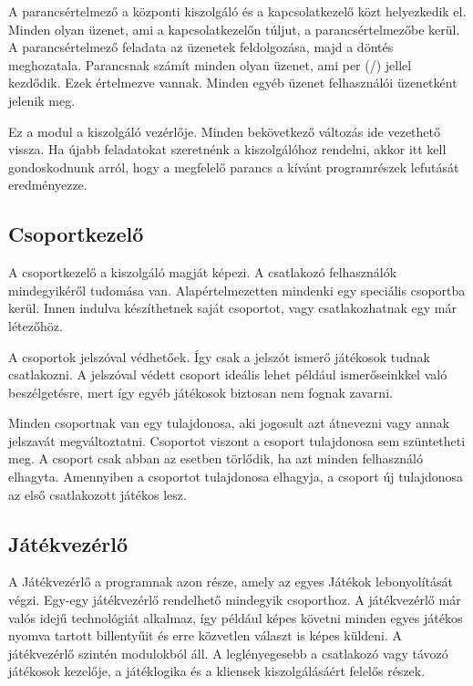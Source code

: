 \documentclass[bibliography=totocnumbered]{article}
\begin{document}
A parancsértelmező a központi kiszolgáló és a kapcsolatkezelő közt
helyezkedik el. Minden olyan üzenet, ami a kapcsolatkezelőn túljut, a
parancsértelmezőbe kerül. A parancsértelmező feladata az üzenetek
feldolgozása, majd a döntés meghozatala. Parancsnak számít minden olyan
üzenet, ami per (/) jellel kezdődik. Ezek értelmezve vannak. Minden
egyéb üzenet felhasználói üzenetként jelenik meg.

Ez a modul a kiszolgáló vezérlője. Minden bekövetkező változás ide
vezethető vissza. Ha újabb feladatokat szeretnénk a kiszolgálóhoz
rendelni, akkor itt kell gondoskodnunk arról, hogy a megfelelő parancs a
kívánt programrészek lefutását eredményezze.


\subsection{Csoportkezelő}

A csoportkezelő a kiszolgáló magját képezi. A csatlakozó felhasználók
mindegyikéről tudomása van. Alapértelmezetten mindenki egy speciális
csoportba kerül. Innen indulva készíthetnek saját csoportot, vagy
csatlakozhatnak egy már létezőhöz.

A csoportok jelszóval védhetőek. Így csak a jelszót ismerő játékosok
tudnak csatlakozni. A jelszóval védett csoport ideális lehet például
ismerőseinkkel való beszélgetésre, mert így egyéb játékosok biztosan nem
fognak zavarni.

Minden csoportnak van egy tulajdonosa, aki jogosult azt átnevezni vagy
annak jelszavát megváltoztatni. Csoportot viszont a csoport tulajdonosa
sem szüntetheti meg. A csoport csak abban az esetben törlődik, ha azt
minden felhasználó elhagyta. Amennyiben a csoportot tulajdonosa
elhagyja, a csoport új tulajdonosa az első csatlakozott játékos lesz.


\subsection{Játékvezérlő}

A Játékvezérlő a programnak azon része, amely az egyes Játékok
lebonyolítását végzi. Egy-egy játékvezérlő rendelhető mindegyik
csoporthoz. A játékvezérlő már valós idejű technológiát alkalmaz, így
például képes követni minden egyes játékos nyomva tartott billentyűit és
erre közvetlen választ is képes küldeni. A játékvezérlő szintén
modulokból áll. A leglényegesebb a csatlakozó vagy távozó játékosok
kezelője, a játéklogika és a kliensek kiszolgálásáért felelős részek.
\end{document}
